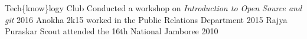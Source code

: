 \begin{cvhonors}
  \cvhonor
    {Tech\{know\}logy Club}
    {Conducted a workshop on \textit{Introduction to Open Source and git}}
    {}
    {2016}
  \cvhonor
    {Anokha 2k15}
    {worked in the Public Relations Department}
    {}
    {2015}
  \cvhonor
    {Rajya Puraskar Scout}
    {attended the 16th National Jamboree}
    {}
    {2010}
\end{cvhonors}